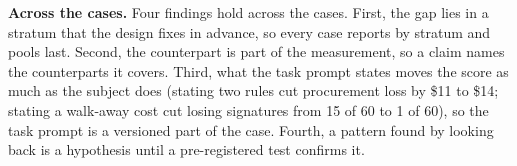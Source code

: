 \textbf{Across the cases.} Four findings hold across the cases. First, the gap lies in a stratum that the design fixes in
advance, so every case reports by stratum and pools last. Second, the counterpart is part of the measurement, so a
claim names the counterparts it covers. Third, what the task prompt states moves the score as much as the subject does
(stating two rules cut procurement loss by \$11 to \$14; stating a walk-away cost cut losing signatures from 15 of 60 to
1 of 60), so the task prompt is a versioned part of the case. Fourth, a pattern found by looking back is a hypothesis
until a pre-registered test confirms it.
